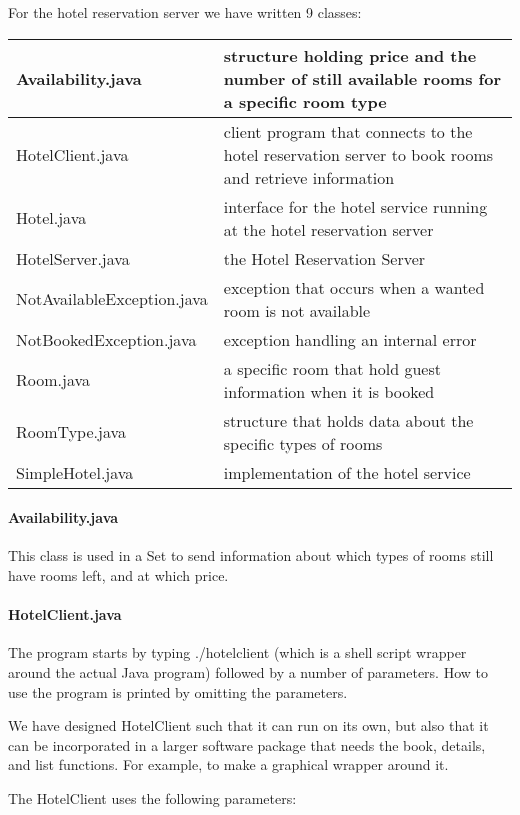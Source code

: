 \documentclass[a4paper,10pt]{article}
\begin{document}
For the hotel reservation server we have written 9 classes:
\begin{center}
\begin{tabular}{ l | p{7.0cm} }
Availability.java & structure holding price and the number of still available rooms for a specific room type\\ \hline
HotelClient.java & client program that connects to the hotel reservation server to book rooms and retrieve information\\ \hline
Hotel.java & interface for the hotel service running at the hotel reservation server\\ \hline
HotelServer.java & the Hotel Reservation Server\\ \hline
NotAvailableException.java & exception that occurs when a wanted room is not available\\ \hline
NotBookedException.java & exception handling an internal error\\ \hline
Room.java & a specific room that hold guest information when it is booked\\ \hline
RoomType.java & structure that holds data about the specific types of rooms\\ \hline
SimpleHotel.java & implementation of the hotel service\\
\end{tabular}
\end{center}

\paragraph{Availability.java}
This class is used in a Set to send information about which types of rooms still have rooms left, and at which price.

\paragraph{HotelClient.java}
The program starts by typing ./hotelclient (which is a shell script wrapper around the actual Java program) followed by a number of parameters. How to use the program is printed by omitting the parameters.

We have designed HotelClient such that it can run on its own, but also that it can be incorporated in a larger software package that needs the book, details, and list functions. For example, to make a graphical wrapper around it.

The HotelClient uses the following parameters:
\end{document}
